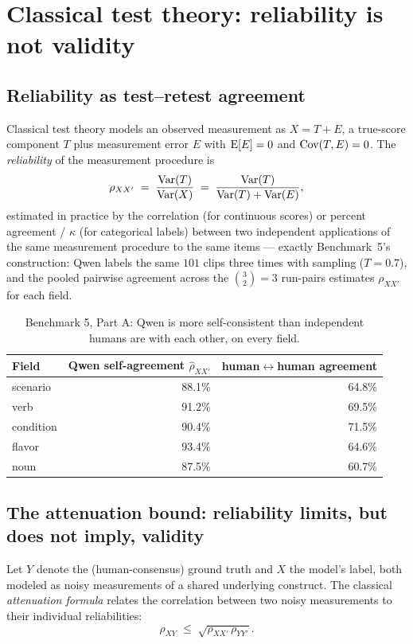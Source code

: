 \section{Classical test theory: reliability is not validity}
\label{sec:reliability}

\subsection{Reliability as test--retest agreement}

Classical test theory models an observed measurement as
$X = T + E$, a true-score component $T$ plus measurement error $E$
with $\operatorname{E}[E]=0$ and $\operatorname{Cov}(T,E)=0$. The \emph{reliability} of the
measurement procedure is
\[
  \rho_{XX'} \;=\; \frac{\operatorname{Var}(T)}{\operatorname{Var}(X)} \;=\; \frac{\operatorname{Var}(T)}{\operatorname{Var}(T)+\operatorname{Var}(E)},
\]
estimated in practice by the correlation (for continuous scores) or
percent agreement / $\kappa$ (for categorical labels) between two
independent applications of the same measurement procedure to the same
items --- exactly Benchmark~5's construction: Qwen labels the same $101$
clips three times with sampling ($T{=}0.7$), and the pooled pairwise
agreement across the $\binom{3}{2}=3$ run-pairs estimates $\rho_{XX'}$
for each field.

\begin{table}[h]
\centering
\begin{tabular}{lrr}
\toprule
Field & Qwen self-agreement $\hat\rho_{XX'}$ & human$\leftrightarrow$human agreement \\
\midrule
scenario  & 88.1\% & 64.8\% \\
verb      & 91.2\% & 69.5\% \\
condition & 90.4\% & 71.5\% \\
flavor    & 93.4\% & 64.6\% \\
noun      & 87.5\% & 60.7\% \\
\bottomrule
\end{tabular}
\caption{Benchmark 5, Part A: Qwen is more self-consistent than independent
humans are with each other, on every field.}
\end{table}

\subsection{The attenuation bound: reliability limits, but does not imply, validity}

Let $Y$ denote the (human-consensus) ground truth and $X$ the model's
label, both modeled as noisy measurements of a shared underlying construct.
The classical \emph{attenuation formula} relates the correlation between
two noisy measurements to their individual reliabilities:
\[
  \rho_{XY} \;\le\; \sqrt{\rho_{XX'}\,\rho_{YY'}}.
\]

